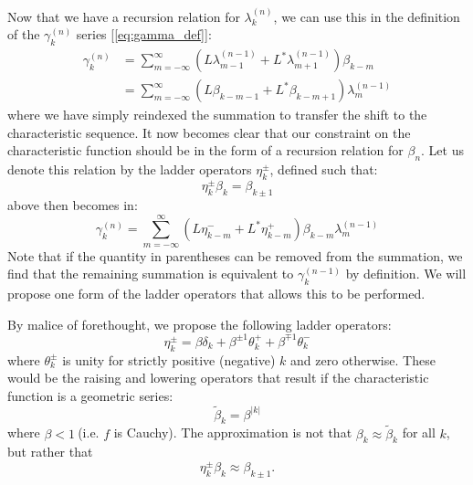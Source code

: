 Now that we have a recursion relation for \(\lambda_{k}^{(n)}\), we can use this in the definition of the \(\gamma_{k}^{(n)}\) series [\cref{eq:gamma_def}]:
\begin{subequations}
\begin{align}
\gamma_{k}^{(n)} &= \sum_{m = - \infty}^{\infty}{\left( L\lambda_{m - 1}^{(n - 1)} + L^{*}\lambda_{m + 1\ }^{(n - 1)} \right)\beta_{k - m}}\\
&= \sum_{m = - \infty}^{\infty}{\left( L\beta_{k - m - 1} + L^{*}\beta_{k - m + 1} \right)\lambda_{m}^{(n - 1)}}\label{eq:19_gamma_int1}
\end{align}
\end{subequations}
where we have simply reindexed the summation to transfer the shift to
the characteristic sequence. It now becomes clear that our constraint on
the characteristic function should be in the form of a recursion
relation for \(\beta_{n}\). Let us denote this relation by the
ladder operators \(\eta_{k}^{\pm}\), defined such that:
\begin{equation}
\eta_{k}^{\pm}\beta_{k} = \beta_{k \pm 1}
\end{equation}
 above then becomes in:
\begin{equation}
\gamma_{k}^{(n)} = \sum_{m = - \infty}^{\infty}{\left( L\eta_{k - m}^{-} + L^{*}\eta_{k - m}^{+} \right)\beta_{k - m}\lambda_{m}^{(n - 1)}}\label{eq:19_gamma_int2}
\end{equation}
Note that if the quantity in parentheses can be removed from the summation, we find that the remaining summation is equivalent to \(\gamma_{k}^{(n - 1)}\) by definition. We will propose one form of the ladder operators that allows this to be performed.

By malice of forethought, we propose the following ladder operators:
\begin{equation}
\eta_{k}^{\pm} = \beta\delta_{k} + \beta^{\pm 1}\theta_{k}^{+} + \beta^{\mp 1}\theta_{k}^{-}
\end{equation}
where \(\theta_{k}^{\pm}\) is unity for strictly positive (negative) \(k\) and zero otherwise. These would be the raising and lowering operators that result if the characteristic function is a geometric series:
\begin{equation}
{\widetilde{\beta}}_{k} = \beta^{|k|}
\end{equation}
where \(\beta < 1\ \)(i.e. \(f\) is Cauchy). The approximation is not that \(\beta_{k} \approx {\widetilde{\beta}}_{k}\) for all \(k\),
but rather that
\begin{equation}
\eta_{k}^{\pm}\beta_{k} \approx \beta_{k \pm 1}.
\end{equation}

